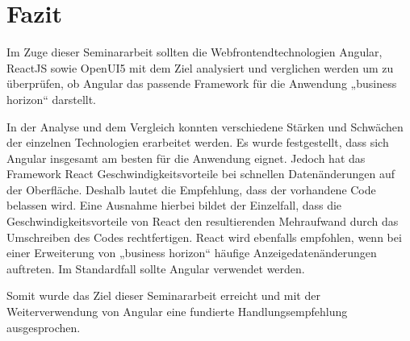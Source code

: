 

\chapter{Fazit}

Im Zuge dieser Seminararbeit sollten die Webfrontendtechnologien Angular, ReactJS sowie OpenUI5 mit dem Ziel analysiert und verglichen werden um zu überprüfen, ob Angular das passende Framework für die Anwendung „business horizon“ darstellt. 

In der Analyse und dem Vergleich konnten verschiedene Stärken und Schwächen der einzelnen Technologien erarbeitet werden. Es wurde festgestellt, dass sich Angular insgesamt am besten für die Anwendung eignet. Jedoch hat das Framework React Geschwindigkeitsvorteile bei schnellen Datenänderungen auf der Oberfläche. Deshalb lautet die Empfehlung, dass der vorhandene Code belassen wird. Eine Ausnahme hierbei bildet der Einzelfall, dass die Geschwindigkeitsvorteile von React den resultierenden Mehraufwand durch das Umschreiben des Codes rechtfertigen. React wird ebenfalls empfohlen, wenn bei einer Erweiterung von „business horizon“ häufige Anzeigedatenänderungen auftreten. Im Standardfall sollte Angular verwendet werden.

Somit wurde das Ziel dieser Seminararbeit erreicht und mit der Weiterverwendung von Angular eine fundierte Handlungsempfehlung ausgesprochen.
